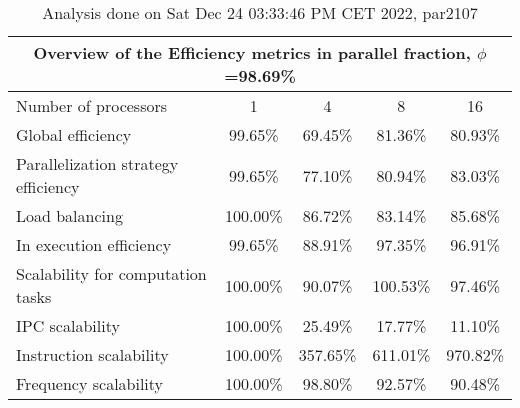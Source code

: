 \begin{table}[h]
\begin{center}
\begin{tabular}{|l|c|c|c|c|}
\hline
\multicolumn{5}{|c|}{Overview of the Efficiency metrics in parallel fraction, $\phi$=98.69\%} \\
\hline
\hline
Number of processors & 1 & 4 & 8 & 16 \\
\hline
\hline
Global efficiency                      &     99.65\% &     69.45\% &     81.36\% &     80.93\% \\
\hline
\hline
Parallelization strategy efficiency &     99.65\% &     77.10\% &     80.94\% &     83.03\% \\
\hline
Load balancing                   &    100.00\% &     86.72\% &     83.14\% &     85.68\% \\
In execution efficiency          &     99.65\% &     88.91\% &     97.35\% &     96.91\% \\
\hline
\hline
Scalability for computation tasks   &    100.00\% &     90.07\% &    100.53\% &     97.46\% \\
\hline
IPC scalability                  &    100.00\% &     25.49\% &     17.77\% &     11.10\% \\
Instruction scalability          &    100.00\% &    357.65\% &    611.01\% &    970.82\% \\
Frequency scalability            &    100.00\% &     98.80\% &     92.57\% &     90.48\% \\
\hline
\end{tabular}
\end{center}
\caption{ Analysis done on Sat Dec 24 03:33:46 PM CET 2022, par2107}
\end{table}

